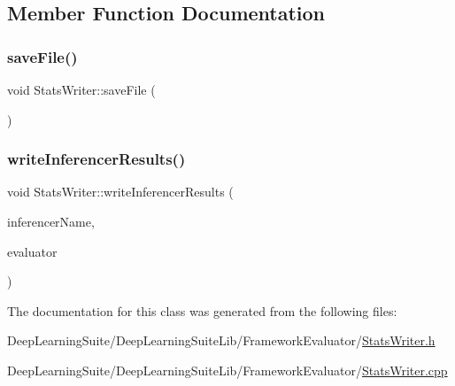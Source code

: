 \subsection{Member Function Documentation}
\mbox{\label{class_stats_writer_ad81e2697e713bfc4903b1260b3e5d952}} 
\subsubsection{\texorpdfstring{save\+File()}{saveFile()}}
{\footnotesize\ttfamily void Stats\+Writer\+::save\+File (\begin{DoxyParamCaption}{ }\end{DoxyParamCaption})}

\mbox{\label{class_stats_writer_a3eaa872621d87d7c26df3d4d810ee759}} 
\subsubsection{\texorpdfstring{write\+Inferencer\+Results()}{writeInferencerResults()}}
{\footnotesize\ttfamily void Stats\+Writer\+::write\+Inferencer\+Results (\begin{DoxyParamCaption}\item[{std\+::string}]{inferencer\+Name,  }\item[{\hyperlink{_detections_evaluator_8h_ad123715cbea5e203556b7efa1ec44d77}{Detections\+Evaluator\+Ptr}}]{evaluator }\end{DoxyParamCaption})}



The documentation for this class was generated from the following files\+:\begin{DoxyCompactItemize}
\item 
Deep\+Learning\+Suite/\+Deep\+Learning\+Suite\+Lib/\+Framework\+Evaluator/\hyperlink{_stats_writer_8h}{Stats\+Writer.\+h}\item 
Deep\+Learning\+Suite/\+Deep\+Learning\+Suite\+Lib/\+Framework\+Evaluator/\hyperlink{_stats_writer_8cpp}{Stats\+Writer.\+cpp}\end{DoxyCompactItemize}
